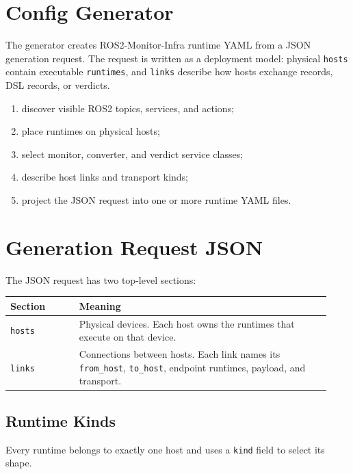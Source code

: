 \documentclass[11pt]{article}
\begin{document}
\section{Config Generator}

The generator creates ROS2-Monitor-Infra runtime YAML from a JSON generation
request. The request is written as a deployment model: physical
\texttt{hosts} contain executable \texttt{runtimes}, and \texttt{links}
describe how hosts exchange records, DSL records, or verdicts.

\begin{enumerate}
  \item discover visible ROS2 topics, services, and actions;
  \item place runtimes on physical hosts;
  \item select monitor, converter, and verdict service classes;
  \item describe host links and transport kinds;
  \item project the JSON request into one or more runtime YAML files.
\end{enumerate}

\section{Generation Request JSON}

The JSON request has two top-level sections:

\begin{tabular}{@{}p{0.20\linewidth}p{0.73\linewidth}@{}}
\toprule
Section & Meaning \\
\midrule
\texttt{hosts} &
Physical devices. Each host owns the runtimes that execute on that device. \\
\texttt{links} &
Connections between hosts. Each link names its \texttt{from\_host},
\texttt{to\_host}, endpoint runtimes, payload, and transport. \\
\bottomrule
\end{tabular}

\subsection{Runtime Kinds}

Every runtime belongs to exactly one host and uses a \texttt{kind} field to
select its shape.
\end{document}
